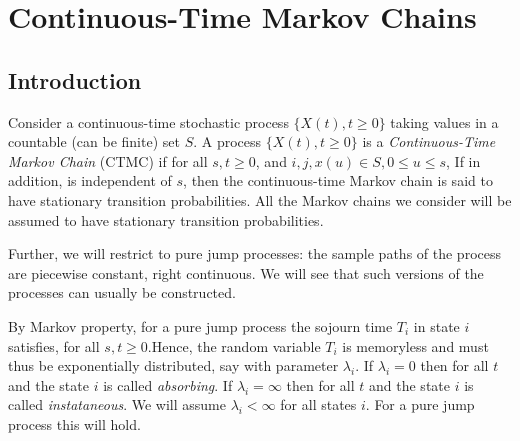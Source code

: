 \documentclass[all-lectures.tex]{subfiles}
\begin{document}

\chapter{Continuous-Time Markov Chains}
\setcounter{section}{0}
\setcounter{subsection}{0}

\section*{}
\section{Introduction}
Consider a continuous-time stochastic process $\{X(t),t\ge0\}$ taking values in a countable (can be finite) set $S$.
A process $\{X(t),t\ge0\}$ is a \textit{Continuous-Time Markov Chain} (CTMC) if for all $s,t \ge 0$, and $i,j,x(u) \in S, 0\le u\le s$,
If in addition,
is independent of $s$, then the continuous-time Markov chain is said to have stationary transition probabilities. 
All the Markov chains we consider will be assumed to have stationary transition probabilities.

Further, we will restrict to pure jump processes: the sample paths of the process are piecewise constant, right continuous. We will see that such versions of the processes can usually be constructed.

By Markov property, for a pure jump process the sojourn time $T_i$ in state $i$ satisfies,
for all $s,t \ge 0$.Hence, the random variable $T_i$ is memoryless and must thus be exponentially distributed, say with parameter $\lambda_i$.
If $\lambda_i = 0$ then
for all $t$ and the state $i$ is called \textit{absorbing}.
If $\lambda_i = \infty$ then
for all $t$ and the state $i$ is called \textit{instataneous}. We will assume $\lambda_i < \infty$ for all states $i$. For a pure jump process this will hold.
\end{document}
